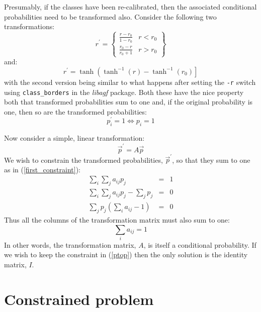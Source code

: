 \documentclass{article}
\begin{document}
Presumably, if the classes have been re-calibrated, then the associated 
conditional probabilities need to be transformed also.
Consider the following two transformations:
\begin{equation}
r^\prime = \left \lbrace
\begin{array}{lr}
\frac{r-r_0}{1-r_0} & r<r_0 \\
\frac{r_0-r}{r_0+1} & r>r_0
\end{array} \right \rbrace
\end{equation}
and:
\begin{equation}
r^\prime=\tanh \left (\tanh^{-1}(r)-\tanh^{-1}(r_0) \right ]
\end{equation}
with the second version being similar to what happens after setting the 
\verb/-r/ switch using \verb/class_borders/ in the {\it libagf} package.
Both these have the nice property both that transformed probabilities sum
to one and, if the original probability is one, then so are the transformed
probabilities:
\begin{equation}
p_i^\prime=1 \iff p_i=1
\label{ptop}
\end{equation}

Now consider a simple, linear transformation:
\begin{equation}
\vec p^\prime = A \vec p
\end{equation}
We wish to constrain the transformed probabilities, $\vec p^\prime$,
so that they sum to one as in (\ref{first_constraint}):
\begin{eqnarray}
\sum_i \sum_j a_{ij} p_j & = & 1 \\
\sum_i \sum_j a_{ij} p_j - \sum_j p_j & = & 0 \\
\sum_j p_j \left (\sum_i a_{ij} - 1 \right ) & = & 0
\end{eqnarray}
Thus all the columns of the transformation matrix must also sum to one:
\begin{equation}
\sum_i a_{ij} = 1
\end{equation}
In other words, the transformation matrix, $A$, is itself a conditional
probability.  If we wish to keep the constraint in (\ref{ptop}) then the only
solution is the identity matrix, $I$.


\section{Constrained problem}
\end{document}
